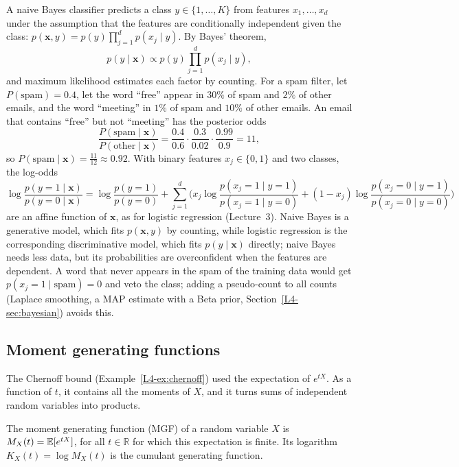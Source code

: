 \begin{example}\label{L4-ex:naive-bayes}
    A naive Bayes classifier predicts a class $y \in \{1, \ldots, K\}$ from features $x_1, \ldots, x_d$ under the assumption that the features are conditionally independent given the class: $p(\mathbf{x}, y) = p(y)\prod_{j=1}^d p(x_j \mid y)$. By Bayes' theorem,
    \[p(y \mid \mathbf{x}) \propto p(y)\prod_{j=1}^d p(x_j \mid y),\]
    and maximum likelihood estimates each factor by counting. For a spam filter, let $P(\text{spam}) = 0.4$, let the word ``free'' appear in $30\%$ of spam and $2\%$ of other emails, and the word ``meeting'' in $1\%$ of spam and $10\%$ of other emails. An email that contains ``free'' but not ``meeting'' has the posterior odds
    \[\frac{P(\text{spam} \mid \mathbf{x})}{P(\text{other} \mid \mathbf{x})} = \frac{0.4}{0.6} \cdot \frac{0.3}{0.02} \cdot \frac{0.99}{0.9} = 11,\]
    so $P(\text{spam} \mid \mathbf{x}) = \frac{11}{12} \approx 0.92$. With binary features $x_j \in \{0, 1\}$ and two classes, the log-odds
    \[\log\frac{p(y = 1 \mid \mathbf{x})}{p(y = 0 \mid \mathbf{x})} = \log\frac{p(y = 1)}{p(y = 0)} + \sum_{j=1}^d\Big(x_j\log\frac{p(x_j = 1 \mid y = 1)}{p(x_j = 1 \mid y = 0)} + (1 - x_j)\log\frac{p(x_j = 0 \mid y = 1)}{p(x_j = 0 \mid y = 0)}\Big)\]
    are an affine function of $\mathbf{x}$, as for logistic regression (Lecture~3). Naive Bayes is a generative model, which fits $p(\mathbf{x}, y)$ by counting, while logistic regression is the corresponding discriminative model, which fits $p(y \mid \mathbf{x})$ directly; naive Bayes needs less data, but its probabilities are overconfident when the features are dependent. A word that never appears in the spam of the training data would get $p(x_j = 1 \mid \text{spam}) = 0$ and veto the class; adding a pseudo-count to all counts (Laplace smoothing, a MAP estimate with a Beta prior, Section~\ref{L4-sec:bayesian}) avoids this.
\end{example}

\subsection{Moment generating functions}\label{L4-sec:mgf}

The Chernoff bound (Example~\ref{L4-ex:chernoff}) used the expectation of $e^{tX}$. As a function of $t$, it contains all the moments of $X$, and it turns sums of independent random variables into products.

\begin{definition}\label{L4-def:mgf}
    The moment generating function (MGF) of a random variable $X$ is $M_X(t) = \mathbb{E}[e^{tX}]$, for all $t \in \mathbb{R}$ for which this expectation is finite. Its logarithm $K_X(t) = \log M_X(t)$ is the cumulant generating function.
\end{definition}

